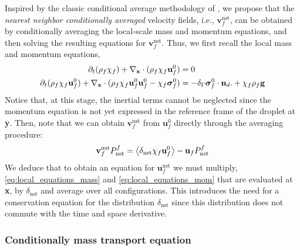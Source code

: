 Inspired by the classic conditional average methodology of \citet{hinch1977averaged}, we propose that the \textit{nearest neighbor conditionally averaged} velocity fields, i.e., $\textbf{v}_f^\text{nst}$, can be obtained by conditionally averaging the local-scale mass and momentum equations, and then solving the resulting equations for $\textbf{v}_f^\text{nst}$. 
Thus, we first recall the local mass and momentum equations, 
\begin{align}
    \pddt (\rho_f\chi_f) +  \pddx \cdot (\rho_f\chi_f\textbf{u}^0_f) &= 0 
    \label{eq:local_equations_mass}
    \\
    \pddt (\rho_f\chi_f\textbf{u}^0_f)
    + \pddx\cdot (\rho_f\chi_f\textbf{u}^0_f\textbf{u}^0_f - \chi_f\bm\sigma^0_f)
    &= 
    - \delta_\Gamma \bm\sigma_f^0 \cdot \textbf{n}_d. 
    + \chi_f \rho_f \textbf{g}
    \label{eq:local_equations_mom}
\end{align}
Notice that, at this stage, the inertial terms cannot be neglected since the momentum equation is not yet expressed in the reference frame of the droplet at \textbf{y}. 
Then, note that we can obtain $\textbf{v}_f^\text{nst}$ from $\textbf{u}_f^0$ directly through the averaging procedure: 
\begin{equation}
    \textbf{v}_f^\text{nst} P_\text{nst}^f
    = 
    \left<\delta_\text{nst} \chi_f \textbf{u}_f^0\right>
    - \textbf{u}_f P_\text{nst}^f
\end{equation}
We deduce that to obtain an equation for $\textbf{u}_f^\text{nst}$ we must multiply, \ref{eq:local_equations_mass} and \ref{eq:local_equations_mom} that are evaluated at \textbf{x}, by $\delta_\text{nst}$ and average over all configurations. 
This introduces the need for a conservation equation for the distribution $\delta_\text{nst}$ since this distribution does not commute with the time and space derivative. 

\subsubsection{Conditionally mass transport equation}

